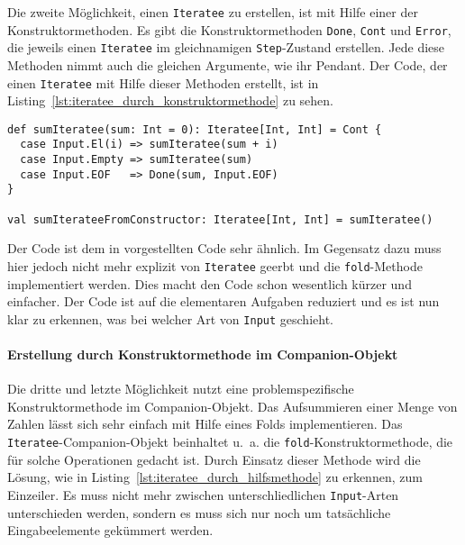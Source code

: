 Die zweite Möglichkeit, einen \lstinline|Iteratee| zu erstellen, ist mit Hilfe einer der Konstruktormethoden.
Es gibt die Konstruktormethoden \lstinline|Done|, \lstinline|Cont| und \lstinline|Error|, die jeweils einen \lstinline|Iteratee| im gleichnamigen \lstinline|Step|-Zustand erstellen.
Jede diese Methoden nimmt auch die gleichen Argumente, wie ihr Pendant.
Der Code, der einen \lstinline|Iteratee| mit Hilfe dieser Methoden erstellt, ist in Listing~\ref{lst:iteratee_durch_konstruktormethode} zu sehen.

\begin{lstlisting}[caption=Erstellung eines Iteratees durch eine Konstruktormethode, label=lst:iteratee_durch_konstruktormethode]
def sumIteratee(sum: Int = 0): Iteratee[Int, Int] = Cont {
  case Input.El(i) => sumIteratee(sum + i)
  case Input.Empty => sumIteratee(sum)
  case Input.EOF   => Done(sum, Input.EOF)
}

val sumIterateeFromConstructor: Iteratee[Int, Int] = sumIteratee()
\end{lstlisting}

Der Code ist dem in  vorgestellten Code sehr ähnlich.
Im Gegensatz dazu muss hier jedoch nicht mehr explizit von \lstinline|Iteratee| geerbt und die \lstinline|fold|-Methode implementiert werden.
Dies macht den Code schon wesentlich kürzer und einfacher.
Der Code ist auf die elementaren Aufgaben reduziert und es ist nun klar zu erkennen, was bei welcher Art von \lstinline|Input| geschieht.


\paragraph{Erstellung durch Konstruktormethode im Companion-Objekt} %
\label{par:erstellung_durch_konstruktormethode_im_companion_objekt}\mbox{} %

Die dritte und letzte Möglichkeit nutzt eine problemspezifische Konstruktormethode im Companion-Objekt.
Das Aufsummieren einer Menge von Zahlen lässt sich sehr einfach mit Hilfe eines Folds implementieren.
Das \lstinline|Iteratee|-Companion-Objekt beinhaltet u.~a. die \lstinline|fold|-Konstruktormethode, die für solche Operationen gedacht ist.
Durch Einsatz dieser Methode wird die Lösung, wie in Listing~\ref{lst:iteratee_durch_hilfsmethode} zu erkennen, zum Einzeiler.
Es muss nicht mehr zwischen unterschliedlichen \lstinline|Input|-Arten unterschieden werden, sondern es muss sich nur noch um tatsächliche Eingabeelemente gekümmert werden.

